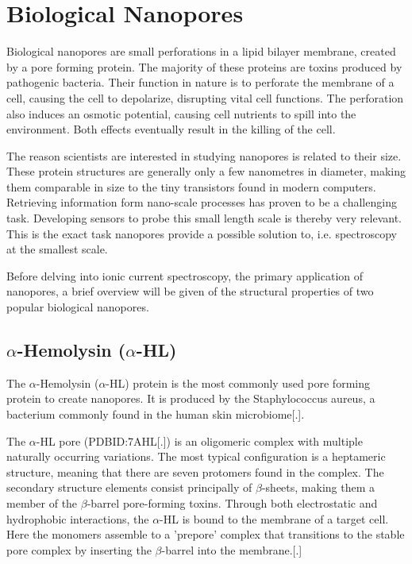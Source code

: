\section{Biological Nanopores}

Biological nanopores are small perforations in a lipid bilayer membrane, created
by a pore forming protein.  The majority of these proteins are toxins produced by
pathogenic bacteria. Their function in nature is to perforate the membrane of a cell,
causing the cell to depolarize, disrupting vital cell functions. The perforation also
induces an osmotic potential, causing cell nutrients to spill into the environment. Both
effects eventually result in the killing of the cell.

The reason scientists are interested in studying nanopores is related to their size.
These protein structures are generally only a few nanometres in diameter, making them
comparable in size to the tiny transistors found in modern computers. Retrieving
information form nano-scale processes has proven to be a challenging task. Developing
sensors to probe this small length scale is thereby very relevant. This is the exact task
nanopores provide a possible solution to, i.e. spectroscopy at the smallest
scale.

Before delving into ionic current spectroscopy, the primary application of nanopores, a
brief overview will be given of the structural properties of two popular biological
nanopores.

\subsection{$\alpha$-Hemolysin ($\alpha$-HL)}

The $\alpha$-Hemolysin ($\alpha$-HL) protein is the most commonly used pore forming
protein to create nanopores. It is produced by the Staphylococcus aureus, a
bacterium commonly found in the human skin microbiome[.].

The $\alpha$-HL pore (PDBID:7AHL[.]) is an oligomeric complex with multiple naturally
occurring variations. The most typical configuration
is a heptameric structure, meaning that there are seven protomers found in the complex.
The secondary structure elements consist principally of $\beta$-sheets, making them a
member of the $\beta$-barrel pore-forming toxins. Through both electrostatic and
hydrophobic interactions, the $\alpha$-HL is bound to the membrane of a target cell. Here
the monomers assemble to a 'prepore' complex that transitions to the stable pore complex
by inserting the $\beta$-barrel into the membrane.[.]

